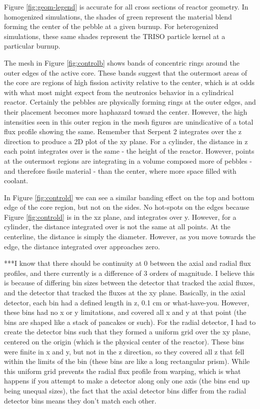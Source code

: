 Figure \ref{fig:geom-legend} is accurate for all cross sections of reactor geometry.  In homogenized simulations, the shades of green represent the material blend forming the center of the pebble at a given burnup.  For heterogenized simulations, these same shades represent the TRISO particle kernel at a particular burnup.




The mesh in Figure \ref{fig:controlb} shows bands of concentric rings around the outer edges of the active core.  These bands suggest that the outermost areas of the core are regions of high fission activity relative to the center, which is at odds with what most might expect from the neutronics behavior in a cylindrical reactor.  Certainly the pebbles are physically forming rings at the outer edges, and their placement becomes more haphazard toward the center.  However, the high intensities seen in this outer region in the mesh figures are unindicative of a total flux profile showing the same.  Remember that Serpent 2 integrates over the z direction to produce a 2D plot of the xy plane.  For a cylinder, the distance in z each point integrates over is the same - the height of the reactor.  However, points at the outermost regions are integrating in a volume composed more of pebbles - and therefore fissile material - than the center, where more space filled with coolant.

In Figure \ref{fig:controld} we can see a similar banding effect on the top and bottom edge of the core region, but not on the sides.  No hot-spots on the edges because Figure \ref{fig:controld} is in the xz plane, and integrates over y.  However, for a cylinder, the distance integrated over is not the same at all points.  At the centerline, the distance is simply the diameter.  However, as you move towards the edge, the distance integrated over approaches zero.




***I know that there should be continuity at 0 between the axial and radial flux profiles, and there currently is a difference of 3 orders of magnitude.  I believe this is because of differing bin sizes between the detector that tracked the axial fluxes, and the detector that tracked the fluxes at the xy plane.  Basically, in the axial detector, each bin had a defined length in z, 0.1 cm or what-have-you.  However, these bins had no x or y limitations, and covered all x and y at that point (the bins are shaped like a stack of pancakes or such).  For the radial detector, I had to create the detector bins such that they formed a uniform grid over the xy plane, centered on the origin (which is the physical center of the reactor).  These bins were finite in x and y, but not in the z direction, so they covered all z that fell within the limits of the bin (these bins are like a long rectangular prism).  While this uniform grid prevents the radial flux profile from warping, which is what happens if you attempt to make a detector along only one axis (the bins end up being unequal sizes), the fact that the axial detector bins differ from the radial detector bins means they don't match each other.

